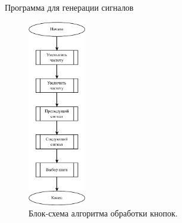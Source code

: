 \documentclass[10pt]{beamer}
\begin{document}
\begin{frame}{Программа для генерации сигналов}
  \begin{figure}
  \includegraphics[width=0.225\textwidth]{buttons}
  \caption{Блок-схема алгоритма обработки кнопок.}
  \end{figure}
\end{frame}
\end{document}
